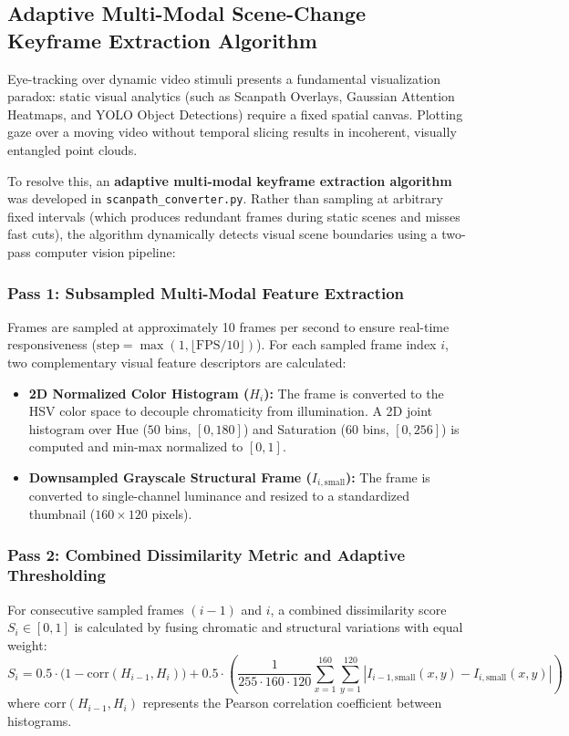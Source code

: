 \documentclass[11pt,a4paper]{article}
\begin{document}
\subsection{Adaptive Multi-Modal Scene-Change Keyframe Extraction Algorithm}
Eye-tracking over dynamic video stimuli presents a fundamental visualization paradox: static visual analytics (such as Scanpath Overlays, Gaussian Attention Heatmaps, and YOLO Object Detections) require a fixed spatial canvas. Plotting gaze over a moving video without temporal slicing results in incoherent, visually entangled point clouds.

To resolve this, an \textbf{adaptive multi-modal keyframe extraction algorithm} was developed in \texttt{scanpath\_converter.py}. Rather than sampling at arbitrary fixed intervals (which produces redundant frames during static scenes and misses fast cuts), the algorithm dynamically detects visual scene boundaries using a two-pass computer vision pipeline:

\subsubsection{Pass 1: Subsampled Multi-Modal Feature Extraction}
Frames are sampled at approximately 10 frames per second to ensure real-time responsiveness ($\text{step} = \max(1, \lfloor \text{FPS} / 10 \rfloor)$). For each sampled frame index $i$, two complementary visual feature descriptors are calculated:
\begin{itemize}[noitemsep,topsep=2pt]
    \item \textbf{2D Normalized Color Histogram ($H_i$):} The frame is converted to the HSV color space to decouple chromaticity from illumination. A 2D joint histogram over Hue ($50$ bins, $[0, 180]$) and Saturation ($60$ bins, $[0, 256]$) is computed and min-max normalized to $[0, 1]$.
    \item \textbf{Downsampled Grayscale Structural Frame ($I_{i, \text{small}}$):} The frame is converted to single-channel luminance and resized to a standardized thumbnail ($160 \times 120$ pixels).
\end{itemize}

\subsubsection{Pass 2: Combined Dissimilarity Metric and Adaptive Thresholding}
For consecutive sampled frames $(i-1)$ and $i$, a combined dissimilarity score $S_i \in [0, 1]$ is calculated by fusing chromatic and structural variations with equal weight:
\begin{equation}
    S_i = 0.5 \cdot \Big(1 - \text{corr}(H_{i-1}, H_i)\Big) + 0.5 \cdot \left( \frac{1}{255 \cdot 160 \cdot 120} \sum_{x=1}^{160}\sum_{y=1}^{120} |I_{i-1, \text{small}}(x,y) - I_{i, \text{small}}(x,y)| \right)
\end{equation}
where $\text{corr}(H_{i-1}, H_i)$ represents the Pearson correlation coefficient between histograms.
\end{document}

